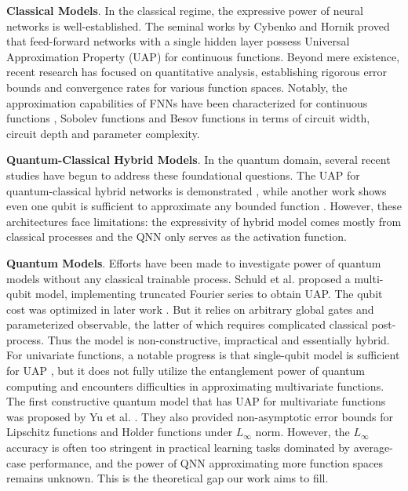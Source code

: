 \documentclass{article}
\theoremstyle{plain}
\theoremstyle{definition}
\theoremstyle{remark}
\begin{document}
\textbf{Classical Models}. In the classical regime, the expressive power of neural networks is well-established. The seminal works by Cybenko \cite{cybenko1989} and Hornik \cite{hornik1989} proved that feed-forward networks with a single hidden layer possess Universal Approximation Property (UAP) for continuous functions. Beyond mere existence, recent research has focused on quantitative analysis, establishing rigorous error bounds and convergence rates for various function spaces. Notably, the approximation capabilities of FNNs have been characterized for continuous functions \cite{shen2019_1,shen2019_2,shen2022,yarotsky2018}, Sobolev functions \cite{yarotsky2017,yarotsky2020,lu2021,yang2025} and Besov functions \cite{siegel2023,suzuki2018,yang2025} in terms of circuit width, circuit depth and parameter complexity.


\textbf{Quantum-Classical Hybrid Models}. In the quantum domain, several recent studies have begun to address these foundational questions. The UAP for quantum-classical hybrid networks is demonstrated \cite{goto2020,hou2023}, while another work shows even one qubit is sufficient to approximate any bounded function \cite{adrian2021}. However, these architectures face limitations: the expressivity of hybrid model comes mostly from classical processes and the QNN only serves as the activation function.

\textbf{Quantum Models}. Efforts have been made to investigate power of quantum models without any classical trainable process. Schuld et al.  proposed a multi-qubit model, implementing truncated Fourier series to obtain UAP. The qubit cost was optimized in later work \cite{perez2024}. But it relies on arbitrary global gates and parameterized observable, the latter of which requires complicated classical post-process. Thus the model is non-constructive, impractical and essentially hybrid. For univariate functions, a notable progress is that single-qubit model is sufficient for UAP \cite{yu2022}, but it does not fully utilize the entanglement power of quantum computing and encounters difficulties in approximating multivariate functions. The first constructive quantum model that has UAP for multivariate functions was proposed by Yu et al. . They also provided non-asymptotic error bounds for Lipschitz functions and H$\ddot{o}$lder functions under $L_\infty$ norm. However, the $L_\infty$ accuracy is often too stringent in practical learning tasks dominated by average-case performance, and the power of QNN approximating more function spaces remains unknown. This is the theoretical gap our work aims to fill.
\end{document}
